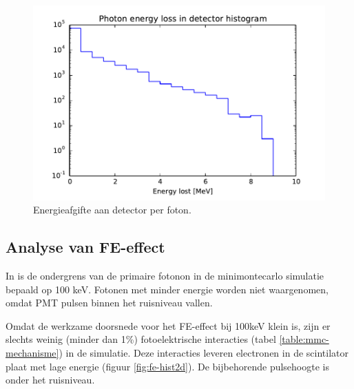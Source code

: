 \documentclass[a4paper,11pt]{article}
\begin{document}
\begin{figure}[t]
  \begin{center}
    \includegraphics{fig-Eloss-hist.pdf}
    \caption{\label{fig:Eloss-hist} Energieafgifte aan detector per foton.}
  \end{center}
\end{figure}



\subsection{Analyse van FE-effect}
In \citep*{Steijger2010-gammas} is de ondergrens van de primaire fotonon in de minimontecarlo simulatie bepaald op 100 keV. Fotonen met minder energie worden niet waargenomen, omdat PMT pulsen binnen het ruisniveau vallen.

Omdat de werkzame doorsnede voor het FE-effect bij 100keV klein is, zijn er slechts weinig (minder dan 1\%) fotoelektrische interacties (tabel  \ref{table:mmc-mechanisme}) in de simulatie. Deze interacties leveren electronen in de scintilator plaat met lage energie (figuur \ref{fig:fe-hist2d}). De bijbehorende pulsehoogte is onder het ruisniveau.
\end{document}
